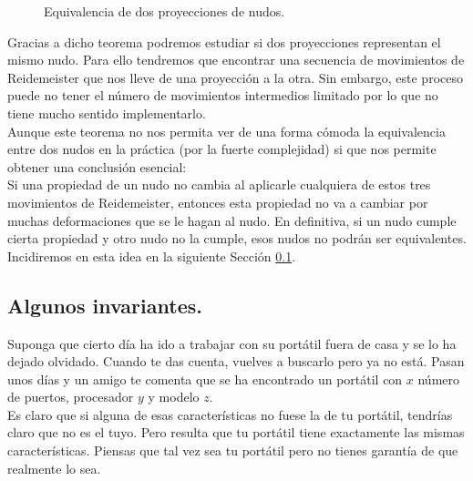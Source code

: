 \documentclass[14pt]{extarticle}
\begin{document}
\begin{figure}[h!]
  	\centering
  	\caption{Equivalencia de dos proyecciones de nudos.}
  	\label{algosj} 
  \end{figure}

Gracias a dicho teorema podremos estudiar si dos proyecciones representan el mismo nudo. Para ello tendremos que encontrar una secuencia de movimientos de Reidemeister que nos lleve de una proyección a la otra. Sin embargo, este proceso puede no tener el número de movimientos intermedios limitado por lo que no tiene mucho sentido implementarlo.\\
 
 Aunque este teorema no nos permita ver de una forma cómoda la equivalencia entre dos nudos en la práctica (por la fuerte complejidad) si que nos permite obtener una conclusión esencial:\\
 
 Si una propiedad de un nudo no cambia al aplicarle cualquiera de estos tres movimientos de Reidemeister, entonces esta propiedad no va a cambiar por muchas deformaciones que se le hagan al nudo. En definitiva, si un nudo cumple cierta propiedad y otro nudo no la cumple, esos nudos no podrán ser equivalentes. Incidiremos en esta idea en la siguiente Sección \ref{seccion5}.
 
  

\newpage
\subsection{Algunos invariantes.}\label{seccion5}
Suponga que cierto día ha ido a trabajar con su portátil fuera de casa y se lo ha dejado olvidado. Cuando te das cuenta, vuelves a buscarlo pero ya no está. Pasan unos días y un amigo te comenta que se ha encontrado un portátil con $x$ número de puertos, procesador $y$ y modelo $z$.\\

Es claro que si alguna de esas características no fuese la de tu portátil, tendrías claro que no es el tuyo. Pero resulta que tu portátil tiene exactamente las mismas características. Piensas que tal vez sea tu portátil pero no tienes garantía de que realmente lo sea. \\
\end{document}
